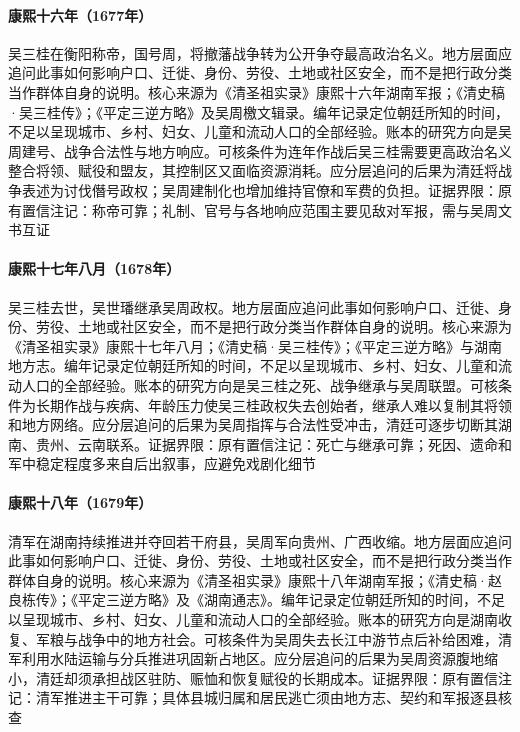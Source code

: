 \hypertarget{social:EQ-1677-WU-ZHOU}{}\paragraph{康熙十六年（1677年）}吴三桂在衡阳称帝，国号周，将撤藩战争转为公开争夺最高政治名义。地方层面应追问此事如何影响户口、迁徙、身份、劳役、土地或社区安全，而不是把行政分类当作群体自身的说明。核心来源为《清圣祖实录》康熙十六年湖南军报；《清史稿·吴三桂传》；《平定三逆方略》及吴周檄文辑录。编年记录定位朝廷所知的时间，不足以呈现城市、乡村、妇女、儿童和流动人口的全部经验。账本的研究方向是吴周建号、战争合法性与地方响应。可核条件为连年作战后吴三桂需要更高政治名义整合将领、赋役和盟友，其控制区又面临资源消耗。应分层追问的后果为清廷将战争表述为讨伐僭号政权；吴周建制化也增加维持官僚和军费的负担。证据界限：原有置信注记：称帝可靠；礼制、官号与各地响应范围主要见敌对军报，需与吴周文书互证
\hypertarget{social:EQ-1678-WU-DEATH}{}\paragraph{康熙十七年八月（1678年）}吴三桂去世，吴世璠继承吴周政权。地方层面应追问此事如何影响户口、迁徙、身份、劳役、土地或社区安全，而不是把行政分类当作群体自身的说明。核心来源为《清圣祖实录》康熙十七年八月；《清史稿·吴三桂传》；《平定三逆方略》与湖南地方志。编年记录定位朝廷所知的时间，不足以呈现城市、乡村、妇女、儿童和流动人口的全部经验。账本的研究方向是吴三桂之死、战争继承与吴周联盟。可核条件为长期作战与疾病、年龄压力使吴三桂政权失去创始者，继承人难以复制其将领和地方网络。应分层追问的后果为吴周指挥与合法性受冲击，清廷可逐步切断其湖南、贵州、云南联系。证据界限：原有置信注记：死亡与继承可靠；死因、遗命和军中稳定程度多来自后出叙事，应避免戏剧化细节
\hypertarget{social:EQ-1679-HUNAN-RECOVERY}{}\paragraph{康熙十八年（1679年）}清军在湖南持续推进并夺回若干府县，吴周军向贵州、广西收缩。地方层面应追问此事如何影响户口、迁徙、身份、劳役、土地或社区安全，而不是把行政分类当作群体自身的说明。核心来源为《清圣祖实录》康熙十八年湖南军报；《清史稿·赵良栋传》；《平定三逆方略》及《湖南通志》。编年记录定位朝廷所知的时间，不足以呈现城市、乡村、妇女、儿童和流动人口的全部经验。账本的研究方向是湖南收复、军粮与战争中的地方社会。可核条件为吴周失去长江中游节点后补给困难，清军利用水陆运输与分兵推进巩固新占地区。应分层追问的后果为吴周资源腹地缩小，清廷却须承担战区驻防、赈恤和恢复赋役的长期成本。证据界限：原有置信注记：清军推进主干可靠；具体县城归属和居民逃亡须由地方志、契约和军报逐县核查
